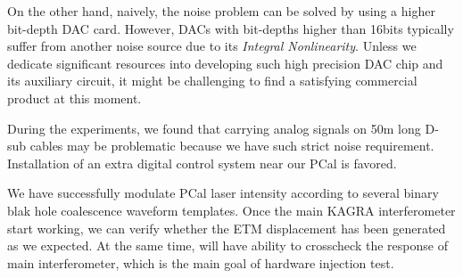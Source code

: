 On the other hand, naively, the noise problem can be solved by using a higher bit-depth DAC card. However, DACs with bit-depths higher than 16bits typically suffer from another noise source due to its \emph{Integral Nonlinearity}. Unless we dedicate significant resources into developing such high precision DAC chip and its auxiliary circuit, it might be challenging to find a satisfying commercial product at this moment. 

During the experiments, we found that carrying analog signals on 50m long D-sub cables may be problematic because we have such strict noise requirement. Installation of an extra digital control system near our PCal is favored.


We have successfully modulate PCal laser intensity according to several binary blak hole coalescence waveform templates. Once the main KAGRA interferometer start working, we can verify whether the ETM displacement has been generated as we expected. At the same time, will have ability to crosscheck the response of main interferometer, which is the main goal of hardware injection test. 





